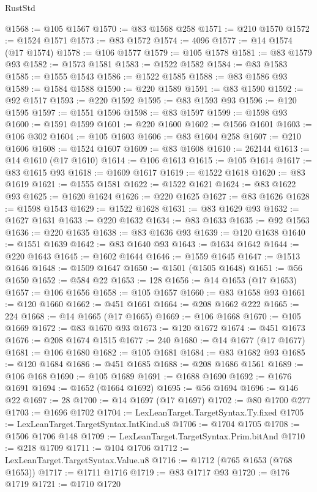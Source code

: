\begin{lexlean}{RustStd}
\begin{coremodule}
@1568 := @105 @1567
@1570 := @83 @1568 @258
@1571 := @210 @1570
@1572 := @1524 @1571
@1573 := @83 @1572
@1574 := 4096
@1577 := @14 @1574 (@17 @1574)
@1578 := @106 @1577
@1579 := @105 @1578
@1581 := @83 @1579 @93
@1582 := @1573 @1581
@1583 := @1522 @1582
@1584 := @83 @1583
@1585 := @1555 @1543
@1586 := @1522 @1585
@1588 := @83 @1586 @93
@1589 := @1584 @1588
@1590 := @220 @1589
@1591 := @83 @1590
@1592 := @92 @1517
@1593 := @220 @1592
@1595 := @83 @1593 @93
@1596 := @120 @1595
@1597 := @1551 @1596
@1598 := @83 @1597
@1599 := @1598 @93
@1600 := @1591 @1599
@1601 := @220 @1600
@1602 := @1566 @1601
@1603 := @106 @302
@1604 := @105 @1603
@1606 := @83 @1604 @258
@1607 := @210 @1606
@1608 := @1524 @1607
@1609 := @83 @1608
@1610 := 262144
@1613 := @14 @1610 (@17 @1610)
@1614 := @106 @1613
@1615 := @105 @1614
@1617 := @83 @1615 @93
@1618 := @1609 @1617
@1619 := @1522 @1618
@1620 := @83 @1619
@1621 := @1555 @1581
@1622 := @1522 @1621
@1624 := @83 @1622 @93
@1625 := @1620 @1624
@1626 := @220 @1625
@1627 := @83 @1626
@1628 := @1598 @1543
@1629 := @1522 @1628
@1631 := @83 @1629 @93
@1632 := @1627 @1631
@1633 := @220 @1632
@1634 := @83 @1633
@1635 := @92 @1563
@1636 := @220 @1635
@1638 := @83 @1636 @93
@1639 := @120 @1638
@1640 := @1551 @1639
@1642 := @83 @1640 @93
@1643 := @1634 @1642
@1644 := @220 @1643
@1645 := @1602 @1644
@1646 := @1559 @1645
@1647 := @1513 @1646
@1648 := @1509 @1647
@1650 := @1501 (@1505 @1648)
@1651 := @56 @1650
@1652 := @584 @22
@1653 := 128
@1656 := @14 @1653 (@17 @1653)
@1657 := @106 @1656
@1658 := @105 @1657
@1660 := @83 @1658 @93
@1661 := @120 @1660
@1662 := @451 @1661
@1664 := @208 @1662 @222
@1665 := 224
@1668 := @14 @1665 (@17 @1665)
@1669 := @106 @1668
@1670 := @105 @1669
@1672 := @83 @1670 @93
@1673 := @120 @1672
@1674 := @451 @1673
@1676 := @208 @1674 @1515
@1677 := 240
@1680 := @14 @1677 (@17 @1677)
@1681 := @106 @1680
@1682 := @105 @1681
@1684 := @83 @1682 @93
@1685 := @120 @1684
@1686 := @451 @1685
@1688 := @208 @1686 @1561
@1689 := @106 @168
@1690 := @105 @1689
@1691 := @1688 @1690
@1692 := @1676 @1691
@1694 := @1652 (@1664 @1692)
@1695 := @56 @1694
@1696 := @146 @22
@1697 := 28
@1700 := @14 @1697 (@17 @1697)
@1702 := @80 @1700 @277
@1703 := @1696 @1702
@1704 := LexLeanTarget.TargetSyntax.Ty.fixed
@1705 := LexLeanTarget.TargetSyntax.IntKind.u8
@1706 := @1704 @1705
@1708 := @1506 @1706 @148
@1709 := LexLeanTarget.TargetSyntax.Prim.bitAnd
@1710 := @218 @1709
@1711 := @104 @1706
@1712 := LexLeanTarget.TargetSyntax.Value.u8
@1716 := @1712 (@765 @1653 (@768 @1653))
@1717 := @1711 @1716
@1719 := @83 @1717 @93
@1720 := @176 @1719
@1721 := @1710 @1720

\end{coremodule}
\end{lexlean}
